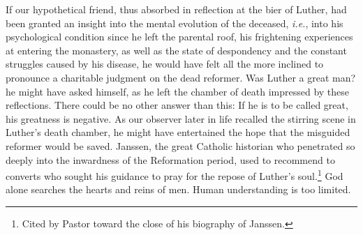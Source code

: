 If our hypothetical friend, thus absorbed in reflection at the bier of
Luther, had been granted an insight into the mental evolution of the deceased,
\textit{i.e.}, into his psychological condition since he left the parental
roof, his frightening experiences at entering the monastery, as well as
the state of despondency and the constant struggles caused by his disease,
he would have felt all the more inclined to pronounce a charitable
judgment on the dead reformer. Was Luther a great man? he might
have asked himself, as he left the chamber of death impressed by these
reflections. There could be no other answer than this: If he is to be
called great, his greatness is negative. As our observer later in life
recalled the stirring scene in Luther’s death chamber, he might have
entertained the hope that the misguided reformer would be saved.
Janssen, the great Catholic historian who penetrated so deeply into
the inwardness of the Reformation period, used to recommend to
converts who sought his guidance to pray for the repose of Luther’s
soul.\footnote{Cited by Pastor toward the close of his biography of Janssen.}
 God alone searches the hearts and reins of men. Human understanding is too limited.

